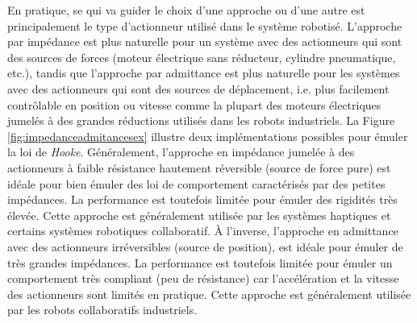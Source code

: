 En pratique, se qui va guider le choix d'une approche ou d'une autre est principalement le type d'actionneur utilisé dans le système robotisé. L'approche par impédance est plus naturelle pour un système avec des actionneurs qui sont des sources de forces (moteur électrique sans réducteur, cylindre pneumatique, etc.), tandis que l'approche par admittance est plus naturelle pour les systèmes avec des actionneurs qui sont des sources de déplacement, i.e. plus facilement contrôlable en position ou vitesse comme la plupart des moteurs électriques jumelés à des grandes réductions utilisés dans les robots industriels. La Figure \ref{fig:impedanceadmitancesex} illustre deux implémentations possibles pour émuler la loi de \textit{Hooke}.
%
Généralement, l'approche en impédance jumelée à des actionneurs à faible résistance hautement réversible (source de force pure) est idéale pour bien émuler des loi de comportement caractérisés par des petites impédances. La performance est toutefois limitée pour émuler des rigidités très élevée. Cette approche est généralement utilisée par les systèmes haptiques et certains systèmes robotiques collaboratif. À l'inverse, l'approche en admittance avec des actionneurs irréversibles (source de position), est idéale pour émuler de très grandes impédances. La performance est toutefois limitée pour émuler un comportement très compliant (peu de résistance) car l'accélération et la vitesse des actionneurs sont limités en pratique. Cette approche est généralement utilisée par les robots collaboratifs industriels. 
